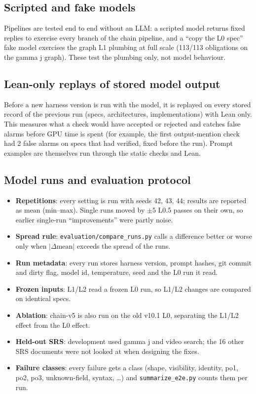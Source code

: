\documentclass[11pt,a4paper]{article}
\newcommand{\file}[1]{\texttt{#1}}
\begin{document}
\subsection{Scripted and fake models}
Pipelines are tested end to end without an LLM: a scripted model returns fixed replies to
exercise every branch of the chain pipeline, and a ``copy the L0 spec'' fake model exercises
the graph L1 plumbing at full scale (113/113 obligations on the gamma j graph). These test the
plumbing only, not model behaviour.

\subsection{Lean-only replays of stored model output}
Before a new harness version is run with the model, it is replayed on every stored record of
the previous run (specs, architectures, implementations) with Lean only. This measures what a
check would have accepted or rejected and catches false alarms before GPU time is spent (for
example, the first output-mention check had 2 false alarms on specs that had verified, fixed
before the run). Prompt examples are themselves run through the static checks and Lean.

\subsection{Model runs and evaluation protocol}
\begin{itemize}
  \item \textbf{Repetitions}: every setting is run with seeds 42, 43, 44; results are
        reported as mean (min--max). Single runs moved by $\pm 5$ L0.5 passes on their own,
        so earlier single-run ``improvements'' were partly noise.
  \item \textbf{Spread rule}: \file{evaluation/compare\_runs.py} calls a difference better or
        worse only when $|\Delta\text{mean}|$ exceeds the spread of the runs.
  \item \textbf{Run metadata}: every run stores harness version, prompt hashes, git commit and
        dirty flag, model id, temperature, seed and the L0 run it read.
  \item \textbf{Frozen inputs}: L1/L2 read a frozen L0 run, so L1/L2 changes are compared on
        identical specs.
  \item \textbf{Ablation}: chain-v5 is also run on the old v10.1 L0, separating the L1/L2
        effect from the L0 effect.
  \item \textbf{Held-out SRS}: development used gamma j and video search; the 16 other SRS
        documents were not looked at when designing the fixes.
  \item \textbf{Failure classes}: every failure gets a class (shape, visibility, identity, po1,
        po2, po3, unknown-field, syntax, \ldots) and \file{summarize\_e2e.py} counts them per run.
\end{itemize}
\end{document}
